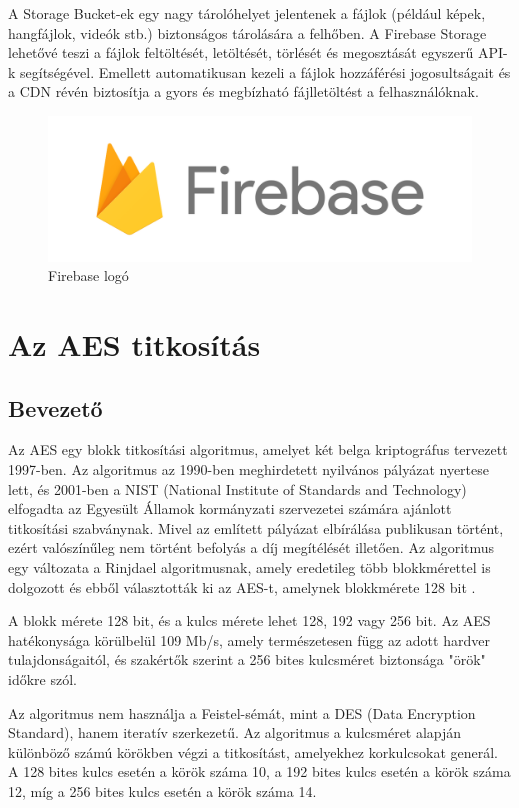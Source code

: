 A Storage Bucket-ek egy nagy tárolóhelyet jelentenek a fájlok (például képek, hangfájlok, videók stb.) biztonságos tárolására a felhőben. A Firebase Storage lehetővé teszi a fájlok feltöltését, letöltését, törlését és megosztását egyszerű API-k segítségével. Emellett automatikusan kezeli a fájlok hozzáférési jogosultságait és a CDN révén biztosítja a gyors és megbízható fájlletöltést a felhasználóknak.

\begin{figure}[!h]
	\centering
	\includegraphics[scale=0.1]{images/firebaseLogo}
	\caption{Firebase logó}
	\label{abra:firebaseLogo}
\end{figure}

\section {Az AES titkosítás}
\subsection {Bevezető}

Az AES egy blokk titkosítási algoritmus, amelyet két belga kriptográfus tervezett 1997-ben. Az algoritmus az 1990-ben meghirdetett nyilvános pályázat nyertese lett, és 2001-ben a NIST (National Institute of Standards and Technology) elfogadta az Egyesült Államok kormányzati szervezetei számára ajánlott titkosítási szabványnak. Mivel az említett pályázat elbírálása publikusan történt, ezért valószínűleg nem történt befolyás a díj megítélését illetően. Az algoritmus egy változata a Rinjdael algoritmusnak, amely eredetileg több blokkmérettel is dolgozott és ebből választották ki az AES-t, amelynek blokkmérete 128 bit \cite{AES}.

A blokk mérete 128 bit, és a kulcs mérete lehet 128, 192 vagy 256 bit. Az AES hatékonysága körülbelül 109 Mb/s, amely természetesen függ az adott hardver tulajdonságaitól, és szakértők szerint a 256 bites kulcsméret biztonsága "örök" időkre szól.

Az algoritmus nem használja a Feistel-sémát, mint a DES (Data Encryption Standard), hanem iteratív szerkezetű. Az algoritmus a kulcsméret alapján különböző számú körökben végzi a titkosítást, amelyekhez korkulcsokat generál. A 128 bites kulcs esetén a körök száma 10, a 192 bites kulcs esetén a körök száma 12, míg a 256 bites kulcs esetén a körök száma 14.


